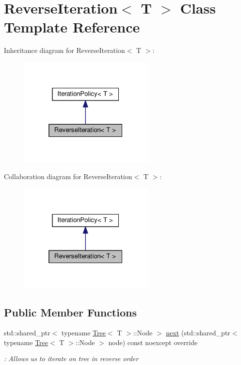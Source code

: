 \hypertarget{classReverseIteration}{}\section{Reverse\+Iteration$<$ T $>$ Class Template Reference}
\label{classReverseIteration}


Inheritance diagram for Reverse\+Iteration$<$ T $>$\+:
\nopagebreak
\begin{figure}[H]
\begin{center}
\leavevmode
\includegraphics[width=193pt]{classReverseIteration__inherit__graph}
\end{center}
\end{figure}


Collaboration diagram for Reverse\+Iteration$<$ T $>$\+:
\nopagebreak
\begin{figure}[H]
\begin{center}
\leavevmode
\includegraphics[width=193pt]{classReverseIteration__coll__graph}
\end{center}
\end{figure}
\subsection*{Public Member Functions}
\begin{DoxyCompactItemize}
\item 
std\+::shared\+\_\+ptr$<$ typename \hyperlink{classTree}{Tree}$<$ T $>$\+::Node $>$ \hyperlink{classReverseIteration_a3ca61dfcdf068fcc2905106a800c96fb}{next} (std\+::shared\+\_\+ptr$<$ typename \hyperlink{classTree}{Tree}$<$ T $>$\+::Node $>$ node) const noexcept override
\begin{DoxyCompactList}\small\item\em \+: Allows us to iterate on tree in reverse order \end{DoxyCompactList}\end{DoxyCompactItemize}


